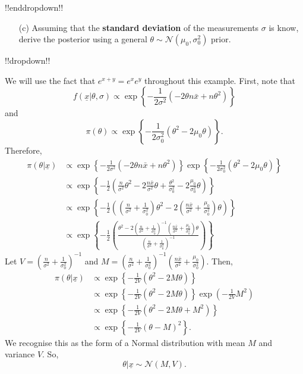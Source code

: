 {!!enddropdown!!

\clearpage

\begin{itemize}
\item [(c)] Assuming that the \textbf{\color{darkblue}standard deviation} of the measurements $\sigma$ is know, derive the posterior using a general $\theta \sim \mathcal{N}(\mu_0, \sigma^2_0)$ prior.
\end{itemize}
!!dropdown!!

We will use the fact that $e^{x+y} = e^x e^y$ throughout this example. First, note that
    $$ f(\underline{x}|\theta, \sigma) \propto \exp\left\{-\frac{1}{2\sigma^2}(-2\theta n\bar{x} + n\theta^2)\right\} $$
    and
    $$ \pi(\theta) \propto \exp\left\{-\frac{1}{2\sigma^2_0}(\theta^2 - 2 \mu_0 \theta)\right\}. $$
    Therefore,
    \begin{align*}
        \pi(\theta|\underline{x}) &\propto \exp\left\{-\frac{1}{2\sigma^2}(-2\theta n\bar{x} + n\theta^2)\right\}\exp\left\{-\frac{1}{2\sigma^2_0}(\theta^2 - 2 \mu_0 \theta)\right\} \\
        &\propto \exp\left\{-\frac{1}{2}\left(\frac{n}{\sigma^2} \theta^2 - 2 \frac{n\bar{x}}{\sigma^2}\theta + \frac{\theta^2}{\sigma_0^2} - 2\frac{\mu_0}{\sigma_0^2} \theta \right)\right\} \\
        &\propto \exp\left\{-\frac{1}{2}\left(\left(\frac{n}{\sigma^2} + \frac{1}{\sigma_0^2}\right)\theta^2 - 2\left(\frac{n\bar{x}}{\sigma^2} + \frac{\mu_0}{\sigma_0^2}\right)\theta\right)\right\} \\
        &\propto \exp\left\{-\frac{1}{2}\left(\frac{\theta^2 - 2\left(\frac{n}{\sigma^2} + \frac{1}{\sigma_0^2}\right)^{-1}\left(\frac{n\bar{x}}{\sigma^2} + \frac{\mu_0}{\sigma_0^2}\right)\theta }{\left(\frac{n}{\sigma^2} + \frac{1}{\sigma_0^2}\right)^{-1}}\right)\right\}
    \end{align*}
    Let $V = \left(\frac{n}{\sigma^2} + \frac{1}{\sigma_0^2}\right)^{-1}$ and $M = \left(\frac{n}{\sigma^2} + \frac{1}{\sigma_0^2}\right)^{-1}\left(\frac{n\bar{x}}{\sigma^2} + \frac{\mu_0}{\sigma_0^2}\right)$. Then,
    \begin{align*}
        \pi(\theta|\underline{x}) &\propto \exp\left\{-\frac{1}{2V}(\theta^2 - 2M\theta)\right\} \\
        &\propto \exp\left\{-\frac{1}{2V}(\theta^2 - 2M\theta)\right\} \exp\left(-\frac{1}{2V}M^2\right) \\
        &\propto \exp\left\{-\frac{1}{2V}(\theta^2 - 2M\theta + M^2)\right\} \\
        &\propto \exp\left\{-\frac{1}{2V}(\theta - M)^2\right\}.
    \end{align*}
    We recognise this as the form of a Normal distribution with mean $M$ and variance $V$. So, 
    $$ \theta |\underline{x} \sim \mathcal{N}(M,V).$$

}
